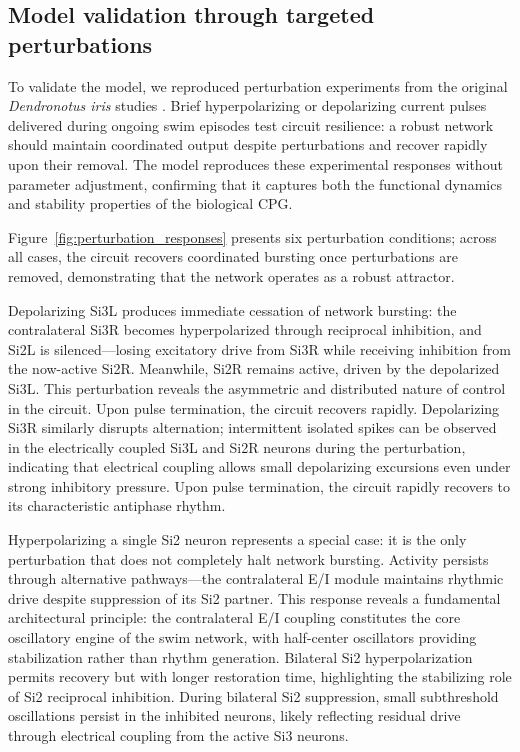 \subsection{Model validation through targeted perturbations}

To validate the model, we reproduced perturbation experiments from the original \textit{Dendronotus iris} studies \cite{SakuraiKatz2016, sakurai2022bursting}.
Brief hyperpolarizing or depolarizing current pulses delivered during ongoing swim episodes test circuit resilience: a robust network should maintain coordinated output despite perturbations and recover rapidly upon their removal.
The model reproduces these experimental responses without parameter adjustment, confirming that it captures both the functional dynamics and stability properties of the biological CPG.

Figure~\ref{fig:perturbation_responses} presents six perturbation conditions; across all cases, the circuit recovers coordinated bursting once perturbations are removed, demonstrating that the network operates as a robust attractor.

Depolarizing Si3L produces immediate cessation of network bursting: the contralateral Si3R becomes hyperpolarized through reciprocal inhibition, and Si2L is silenced---losing excitatory drive from Si3R while receiving inhibition from the now-active Si2R.
Meanwhile, Si2R remains active, driven by the depolarized Si3L.
This perturbation reveals the asymmetric and distributed nature of control in the circuit.
Upon pulse termination, the circuit recovers rapidly.
Depolarizing Si3R similarly disrupts alternation; intermittent isolated spikes can be observed in the electrically coupled Si3L and Si2R neurons during the perturbation, indicating that electrical coupling allows small depolarizing excursions even under strong inhibitory pressure.
Upon pulse termination, the circuit rapidly recovers to its characteristic antiphase rhythm.

Hyperpolarizing a single Si2 neuron represents a special case: it is the only perturbation that does not completely halt network bursting.
Activity persists through alternative pathways---the contralateral E/I module maintains rhythmic drive despite suppression of its Si2 partner.
This response reveals a fundamental architectural principle: the contralateral E/I coupling constitutes the core oscillatory engine of the swim network, with half-center oscillators providing stabilization rather than rhythm generation.
Bilateral Si2 hyperpolarization permits recovery but with longer restoration time, highlighting the stabilizing role of Si2 reciprocal inhibition.
During bilateral Si2 suppression, small subthreshold oscillations persist in the inhibited neurons, likely reflecting residual drive through electrical coupling from the active Si3 neurons.

